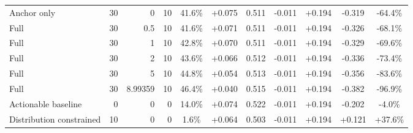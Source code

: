 \begin{table}[htbp]
\begin{tabular}{lrrrccccccc}
Anchor only & 30 & 0 & 10 & 41.6\% & +0.075 & 0.511 & -0.011 & +0.194 & -0.319 & -64.4\% \\
Full & 30 & 0.5 & 10 & 41.6\% & +0.071 & 0.511 & -0.011 & +0.194 & -0.326 & -68.1\% \\
Full & 30 & 1 & 10 & 42.8\% & +0.070 & 0.511 & -0.011 & +0.194 & -0.329 & -69.6\% \\
Full & 30 & 2 & 10 & 43.6\% & +0.066 & 0.512 & -0.011 & +0.194 & -0.336 & -73.4\% \\
Full & 30 & 5 & 10 & 44.8\% & +0.054 & 0.513 & -0.011 & +0.194 & -0.356 & -83.6\% \\
Full & 30 & 8.99359 & 10 & 46.4\% & +0.040 & 0.515 & -0.011 & +0.194 & -0.382 & -96.9\% \\
Actionable baseline & 0 & 0 & 0 & 14.0\% & +0.074 & 0.522 & -0.011 & +0.194 & -0.202 & -4.0\% \\
Distribution constrained & 10 & 0 & 0 & 1.6\% & +0.064 & 0.503 & -0.011 & +0.194 & +0.121 & +37.6\% \\
\bottomrule
\end{tabular}
\end{table}